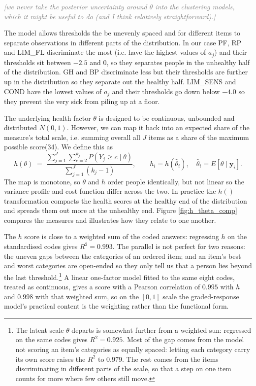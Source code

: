 \documentclass[11pt]{article}
\newcommand{\note}[1]{\textcolor{gray}{\textit{[#1]}}}
\begin{document}
	\note{we never take the posterior uncertainty around $\theta$ into the clustering models, which it might be useful to do (and I think relatively straightforward).} 
	
	The model allows thresholds the be unevenly spaced and for different items to separate observations in different parts of the distribution. In our case PF, RP and LIM\_FL discriminate the most (i.e. have the highest values of $a_j$) and their thresholds sit between $-2.5$ and $0$, so they separates people in the unhealthy half of the distribution. GH and BP discriminate less but their thresholds are further up in the distribution so they separate out the healthy half. LIM\_SENS and COND have the lowest values of $a_j$ and their thresholds go down below $-4.0$ so they prevent the very sick from piling up at a floor.
	
	The underlying health factor $\theta$ is designed to be continuous, unbounded and distributed $N(0,1)$. However, we can map it back into an expected share of the measure's total scale, i.e. summing overall all $J$ items as a share of the maximum possible score(34). We define this as
	\begin{equation}
		h(\theta) \;=\; \frac{\sum_{j=1}^{J} \sum_{c=2}^{k_j} P(Y_j \ge c \mid \theta)}{\sum_{j=1}^{J} (k_j - 1)},
		\qquad h_i = h(\hat\theta_i), \quad \hat\theta_i = E[\theta \mid \mathbf{y}_i].
	\end{equation}
	The map is monotone, so $\theta$ and $h$ order people identically, but not linear so the variance profile and cost function differ across the two. In practice the $h()$ transformation compacts the health scores at the healthy end of the distribution and spreads them out more at the unhealthy end. Figure \ref{fig:h_theta_comp} compares the measures and illustrates how they relate to one another. 
	
	The $h$ score is close to a weighted sum of the coded answers: regressing $h$ on the standardised codes gives $R^2 = 0.993$. The parallel is not perfect for two reasons: the uneven gaps between the categories of an ordered item; and an item's best and worst categories are open-ended so they only tell us that a person lies beyond the last threshold.\footnote{The latent scale $\theta$ departs is somewhat further from a weighted sun: regressed on the same codes gives $R^2 = 0.925$. Most of the gap comes from the model not scoring an item's categories as equally spaced: letting each category carry its own score raises the $R^2$ to $0.979$. The rest comes from the items discriminating in different parts of the scale, so that a step on one item counts for more where few others still move.} A linear one-factor model fitted to the same eight codes, treated as continuous, gives a score with a Pearson correlation of $0.995$ with $h$ and $0.998$ with that weighted sum, so on the $[0,1]$ scale the graded-response model's practical content is the weighting rather than the functional form.
\end{document}
